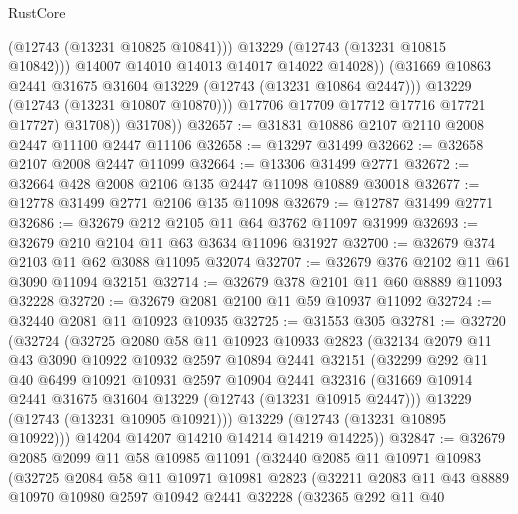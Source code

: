 \begin{lexlean}{RustCore}
\begin{coremodule}
                        (@12743 (@13231 @10825 @10841)))
                      @13229
                      (@12743 (@13231 @10815 @10842)))
                    @14007
                    @14010
                    @14013
                    @14017
                    @14022
                    @14028))
                (@31669 @10863 @2441 @31675 @31604 @13229 (@12743 (@13231 @10864 @2447)))
                @13229
                (@12743 (@13231 @10807 @10870)))
              @17706
              @17709
              @17712
              @17716
              @17721
              @17727)
            @31708))
        @31708))
@32657 := @31831 @10886 @2107 @2110 @2008 @2447 @11100 @2447 @11106
@32658 := @13297 @31499
@32662 := @32658 @2107 @2008 @2447 @11099
@32664 := @13306 @31499 @2771
@32672 := @32664 @428 @2008 @2106 @135 @2447 @11098 @10889 @30018
@32677 := @12778 @31499 @2771 @2106 @135 @11098
@32679 := @12787 @31499 @2771
@32686 := @32679 @212 @2105 @11 @64 @3762 @11097 @31999
@32693 := @32679 @210 @2104 @11 @63 @3634 @11096 @31927
@32700 := @32679 @374 @2103 @11 @62 @3088 @11095 @32074
@32707 := @32679 @376 @2102 @11 @61 @3090 @11094 @32151
@32714 := @32679 @378 @2101 @11 @60 @8889 @11093 @32228
@32720 := @32679 @2081 @2100 @11 @59 @10937 @11092
@32724 := @32440 @2081 @11 @10923 @10935
@32725 := @31553 @305
@32781 := @32720
    (@32724
      (@32725
        @2080
        @58
        @11
        @10923
        @10933
        @2823
        (@32134
          @2079
          @11
          @43
          @3090
          @10922
          @10932
          @2597
          @10894
          @2441
          @32151
          (@32299
            @292
            @11
            @40
            @6499
            @10921
            @10931
            @2597
            @10904
            @2441
            @32316
            (@31669 @10914 @2441 @31675 @31604 @13229 (@12743 (@13231 @10915 @2447)))
            @13229
            (@12743 (@13231 @10905 @10921)))
          @13229
          (@12743 (@13231 @10895 @10922)))
        @14204
        @14207
        @14210
        @14214
        @14219
        @14225))
@32847 := @32679
    @2085
    @2099
    @11
    @58
    @10985
    @11091
    (@32440
      @2085
      @11
      @10971
      @10983
      (@32725
        @2084
        @58
        @11
        @10971
        @10981
        @2823
        (@32211
          @2083
          @11
          @43
          @8889
          @10970
          @10980
          @2597
          @10942
          @2441
          @32228
          (@32365
            @292
            @11
            @40

\end{coremodule}
\end{lexlean}

